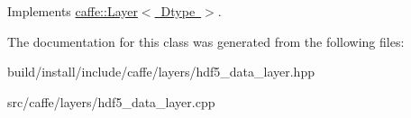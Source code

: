 Implements \mbox{\hyperlink{classcaffe_1_1_layer_a7fe981e8af8d93d587acf2a952be563d}{caffe\+::\+Layer$<$ Dtype $>$}}.



The documentation for this class was generated from the following files\+:\begin{DoxyCompactItemize}
\item 
build/install/include/caffe/layers/hdf5\+\_\+data\+\_\+layer.\+hpp\item 
src/caffe/layers/hdf5\+\_\+data\+\_\+layer.\+cpp\end{DoxyCompactItemize}
